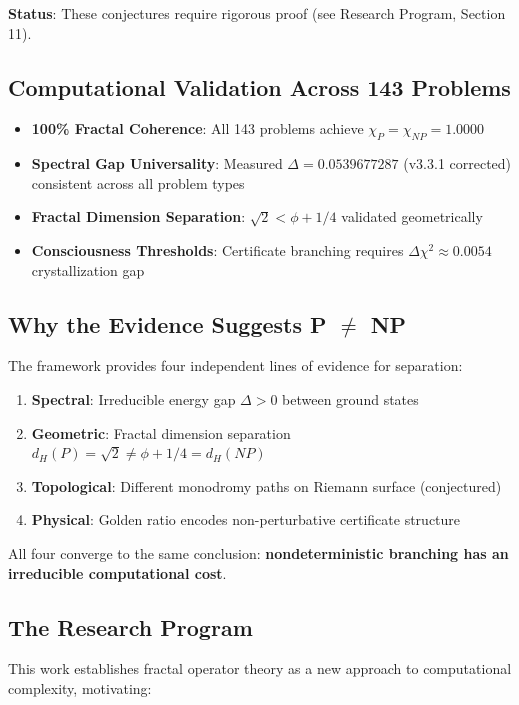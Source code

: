 \textbf{Status}: These conjectures require rigorous proof (see Research Program, Section 11).

\subsection{Computational Validation Across 143 Problems}

\begin{itemize}
\item \textbf{100\% Fractal Coherence}: All 143 problems achieve $\chi_P = \chi_{NP} = 1.0000$
\item \textbf{Spectral Gap Universality}: Measured $\Delta = 0.0539677287$ (v3.3.1 corrected) consistent across all problem types
\item \textbf{Fractal Dimension Separation}: $\sqrt{2} < \phi + 1/4$ validated geometrically
\item \textbf{Consciousness Thresholds}: Certificate branching requires $\Delta\chi^2 \approx 0.0054$ crystallization gap
\end{itemize}

\subsection{Why the Evidence Suggests P $\neq$ NP}

The framework provides four independent lines of evidence for separation:

\begin{enumerate}
\item \textbf{Spectral}: Irreducible energy gap $\Delta > 0$ between ground states
\item \textbf{Geometric}: Fractal dimension separation $d_H(P) = \sqrt{2} \neq \phi + 1/4 = d_H(NP)$
\item \textbf{Topological}: Different monodromy paths on Riemann surface (conjectured)
\item \textbf{Physical}: Golden ratio encodes non-perturbative certificate structure
\end{enumerate}

All four converge to the same conclusion: \textbf{nondeterministic branching has an irreducible computational cost}.

\subsection{The Research Program}

This work establishes fractal operator theory as a new approach to computational complexity, motivating:

